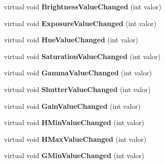 \begin{DoxyCompactItemize}
\item 
virtual void {\bfseries Brightness\+Value\+Changed} (int valor)\hypertarget{classcalibrador_a4ead00fabeef4a3220c77aa7f996188f}{}\label{classcalibrador_a4ead00fabeef4a3220c77aa7f996188f}

\item 
virtual void {\bfseries Exposure\+Value\+Changed} (int valor)\hypertarget{classcalibrador_ab3966d4cd113b91fa2fb8510d4fd8f07}{}\label{classcalibrador_ab3966d4cd113b91fa2fb8510d4fd8f07}

\item 
virtual void {\bfseries Hue\+Value\+Changed} (int valor)\hypertarget{classcalibrador_ac52bb51ae31bd485b12a4d16008e6de7}{}\label{classcalibrador_ac52bb51ae31bd485b12a4d16008e6de7}

\item 
virtual void {\bfseries Saturation\+Value\+Changed} (int valor)\hypertarget{classcalibrador_a10e52c557454eda6ae98e3afa54394c9}{}\label{classcalibrador_a10e52c557454eda6ae98e3afa54394c9}

\item 
virtual void {\bfseries Gamma\+Value\+Changed} (int valor)\hypertarget{classcalibrador_a8ac696f42accb977bc6cb071bc30a368}{}\label{classcalibrador_a8ac696f42accb977bc6cb071bc30a368}

\item 
virtual void {\bfseries Shutter\+Value\+Changed} (int valor)\hypertarget{classcalibrador_a8ee25dd2163ed0244164a792ec00c50c}{}\label{classcalibrador_a8ee25dd2163ed0244164a792ec00c50c}

\item 
virtual void {\bfseries Gain\+Value\+Changed} (int valor)\hypertarget{classcalibrador_a8e86a634548b66d53d6e764474cd8a2f}{}\label{classcalibrador_a8e86a634548b66d53d6e764474cd8a2f}

\item 
virtual void {\bfseries H\+Min\+Value\+Changed} (int valor)\hypertarget{classcalibrador_a24c8f15183420910cc82a7dc31d7b9be}{}\label{classcalibrador_a24c8f15183420910cc82a7dc31d7b9be}

\item 
virtual void {\bfseries H\+Max\+Value\+Changed} (int valor)\hypertarget{classcalibrador_abff01451229da5abaeeaf3f1853528d2}{}\label{classcalibrador_abff01451229da5abaeeaf3f1853528d2}

\item 
virtual void {\bfseries G\+Min\+Value\+Changed} (int valor)\hypertarget{classcalibrador_a2e36d0b7a67ad4a5ab5f2fcfda54d1bc}{}\label{classcalibrador_a2e36d0b7a67ad4a5ab5f2fcfda54d1bc}


\end{DoxyCompactItemize}
